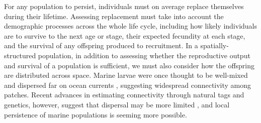 \documentclass[12pt, oneside]{article}   	%
\begin{document}
For any population to persist, individuals must on average replace themselves during their lifetime. Assessing replacement must take into account the demographic processes across the whole life cycle, including how likely individuals are to survive to the next age or stage, their expected fecundity at each stage, and the survival of any offspring produced to recruitment. In a spatially-structured population, in addition to assessing whether the reproductive output and survival of a population is sufficient, we must also consider how the offspring are distributed across space. Marine larvae were once thought to be well-mixed and dispersed far on ocean currents \citep[e.g.][]{roughgarden_recruitment_1988}, suggesting widespread connectivity among patches. Recent advances in estimating connectivity through natural tags and genetics, however, suggest that dispersal may be more limited \citep[e.g.][]{daloia_self-recruitment_2013, hameed2016inverse, almany2017larval}, and local persistence of marine populations is seeming more possible.  %


\end{document}
